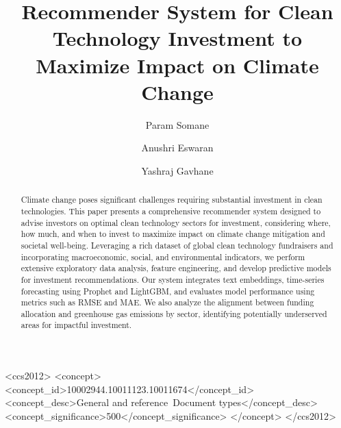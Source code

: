 \documentclass[sigconf]{acmart}
\begin{document}
\title{Recommender System for Clean Technology Investment to Maximize Impact on Climate Change}

\author{Param Somane}

\author{Anushri Eswaran}

\author{Yashraj Gavhane}

\renewcommand\footnotetextcopyrightpermission[1]{} %

\renewcommand{\shortauthors}{Somane, Eswaran, and Gavhane}

\begin{abstract}
Climate change poses significant challenges requiring substantial investment in clean technologies. This paper presents a comprehensive recommender system designed to advise investors on optimal clean technology sectors for investment, considering where, how much, and when to invest to maximize impact on climate change mitigation and societal well-being. Leveraging a rich dataset of global clean technology fundraisers and incorporating macroeconomic, social, and environmental indicators, we perform extensive exploratory data analysis, feature engineering, and develop predictive models for investment recommendations. Our system integrates text embeddings, time-series forecasting using Prophet and LightGBM, and evaluates model performance using metrics such as RMSE and MAE. We also analyze the alignment between funding allocation and greenhouse gas emissions by sector, identifying potentially underserved areas for impactful investment.
\end{abstract}

\begin{CCSXML}
<ccs2012>
<concept>
<concept_id>10002944.10011123.10011674</concept_id>
<concept_desc>General and reference~Document types</concept_desc>
<concept_significance>500</concept_significance>
</concept>
</ccs2012>
\end{CCSXML}

\end{document}
